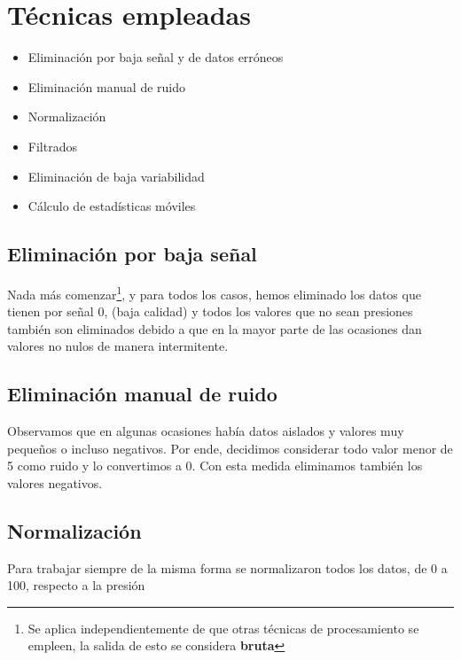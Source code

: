 \documentclass[a4paper,12pt,twoside,oldfontcommands]{memoir}
\begin{document}
\section{Técnicas empleadas}
\begin{itemize}
\item Eliminación por baja señal y de datos erróneos
\item Eliminación manual de ruido
\item Normalización
\item Filtrados
\item Eliminación de baja variabilidad
\item Cálculo de estadísticas móviles 
\end{itemize}
\subsection{Eliminación por baja señal}
Nada más comenzar\footnote{Se aplica independientemente de que otras técnicas de procesamiento se empleen, la salida de esto se considera \textbf{bruta}}, y para todos los casos, hemos eliminado los datos que tienen por señal 0, (baja calidad) y todos los valores que no sean presiones también son eliminados debido a que en la mayor parte de las ocasiones dan valores no nulos de manera intermitente.

\subsection{Eliminación manual de ruido}
Observamos que en algunas ocasiones había datos aislados y valores muy pequeños o incluso negativos. Por ende, decidimos considerar todo valor menor de 5 como ruido y lo convertimos a 0. Con esta medida eliminamos también los valores negativos.
\subsection{Normalización}
Para trabajar siempre de la misma forma se normalizaron todos los datos, de 0 a 100, respecto a la presión
\end{document}
